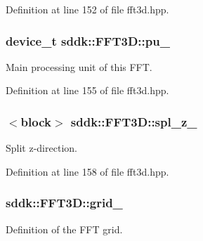 Definition at line 152 of file fft3d.\+hpp.

\hypertarget{classsddk_1_1_f_f_t3_d_abfb4de99fbcab38632fb4870200f1a66}{}
\subsubsection[{pu\+\_\+}]{\setlength{\rightskip}{0pt plus 5cm}device\+\_\+t sddk\+::\+F\+F\+T3\+D\+::pu\+\_\+\hspace{0.3cm}{\ttfamily [protected]}}\label{classsddk_1_1_f_f_t3_d_abfb4de99fbcab38632fb4870200f1a66}


Main processing unit of this F\+F\+T. 



Definition at line 155 of file fft3d.\+hpp.

\hypertarget{classsddk_1_1_f_f_t3_d_a2b8697edcd2c0f1bf81129611c84088d}{}
\subsubsection[{spl\+\_\+z\+\_\+}]{$<$block$>$ sddk\+::\+F\+F\+T3\+D\+::spl\+\_\+z\+\_\+\hspace{0.3cm}{\ttfamily [protected]}}\label{classsddk_1_1_f_f_t3_d_a2b8697edcd2c0f1bf81129611c84088d}


Split z-\/direction. 



Definition at line 158 of file fft3d.\+hpp.

\hypertarget{classsddk_1_1_f_f_t3_d_a27a753a25185a7cadbf0f036f5fb1c98}{}
\subsubsection[{grid\+\_\+}]{ sddk\+::\+F\+F\+T3\+D\+::grid\+\_\+\hspace{0.3cm}{\ttfamily [protected]}}\label{classsddk_1_1_f_f_t3_d_a27a753a25185a7cadbf0f036f5fb1c98}


Definition of the F\+F\+T grid. 



